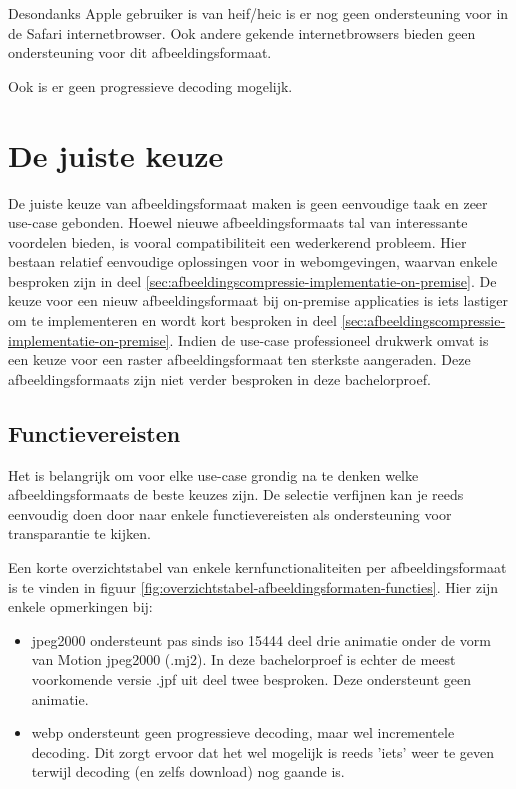 Desondanks Apple gebruiker is van \gls{heif}/\gls{heic} is er nog geen ondersteuning voor in de Safari internetbrowser. Ook andere gekende internetbrowsers bieden geen ondersteuning voor dit \gls{afbeeldingsformaat}.

Ook is er geen progressieve \gls{decoding} mogelijk.

\section{De juiste keuze}
\label{sec:afbeeldingscompressie-keuze}

De juiste keuze van \gls{afbeeldingsformaat} maken is geen eenvoudige taak en zeer \gls{use-case} gebonden. Hoewel nieuwe \glspl{afbeeldingsformaat} tal van interessante voordelen bieden, is vooral compatibiliteit een wederkerend probleem. Hier bestaan relatief eenvoudige oplossingen voor in webomgevingen, waarvan enkele besproken zijn in deel \ref{sec:afbeeldingscompressie-implementatie-on-premise}. De keuze voor een nieuw \gls{afbeeldingsformaat} bij \gls{on-premise} applicaties is iets lastiger om te implementeren en wordt kort besproken in deel \ref{sec:afbeeldingscompressie-implementatie-on-premise}. Indien de \gls{use-case} professioneel drukwerk omvat is een keuze voor een \gls{raster} \gls{afbeeldingsformaat} ten sterkste aangeraden. Deze \glspl{afbeeldingsformaat} zijn niet verder besproken in deze bachelorproef.

\subsection{Functievereisten}
\label{sec:afbeeldingscompressie-functievereisten}

Het is belangrijk om voor elke \gls{use-case} grondig na te denken welke \glspl{afbeeldingsformaat} de beste keuzes zijn. De selectie verfijnen kan je reeds eenvoudig doen door naar enkele functievereisten als ondersteuning voor transparantie te kijken. 

Een korte overzichtstabel van enkele kernfunctionaliteiten per \gls{afbeeldingsformaat} is te vinden in figuur \ref{fig:overzichtstabel-afbeeldingsformaten-functies}. Hier zijn enkele opmerkingen bij:

\begin{itemize}
	\item \gls{jpeg2000} ondersteunt pas sinds \gls{iso} 15444 deel drie animatie onder de vorm van Motion \gls{jpeg2000} (.mj2). In deze bachelorproef is echter de meest voorkomende versie .jpf uit deel twee besproken. Deze ondersteunt geen animatie.
	
	\item \Gls{webp} ondersteunt geen progressieve \gls{decoding}, maar wel incrementele \gls{decoding}. Dit zorgt ervoor dat het wel mogelijk is reeds 'iets' weer te geven terwijl \gls{decoding} (en zelfs download) nog gaande is.
\end{itemize}

